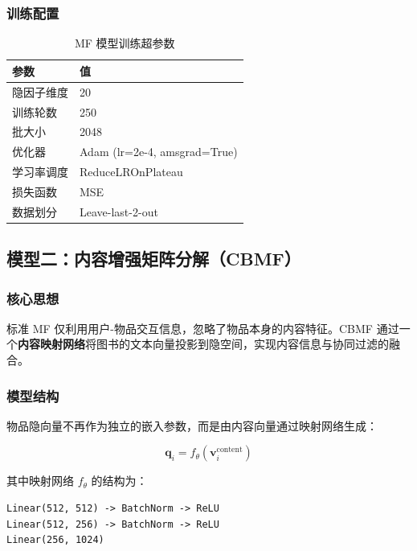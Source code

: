 \documentclass[12pt,a4paper]{article}
\begin{document}
\subsubsection{训练配置}

\begin{table}[H]
\centering
\caption{MF 模型训练超参数}
\begin{tabular}{ll}
\toprule
\textbf{参数} & \textbf{值} \\
\midrule
隐因子维度 & 20 \\
训练轮数 & 250 \\
批大小 & 2048 \\
优化器 & Adam (lr=2e-4, amsgrad=True) \\
学习率调度 & ReduceLROnPlateau \\
损失函数 & MSE \\
数据划分 & Leave-last-2-out \\
\bottomrule
\end{tabular}
\end{table}

\subsection{模型二：内容增强矩阵分解（CBMF）}

\subsubsection{核心思想}

标准 MF 仅利用用户-物品交互信息，忽略了物品本身的内容特征。CBMF 通过一个\textbf{内容映射网络}将图书的文本向量投影到隐空间，实现内容信息与协同过滤的融合。

\subsubsection{模型结构}

物品隐向量不再作为独立的嵌入参数，而是由内容向量通过映射网络生成：

\begin{equation}
    \mathbf{q}_i = f_{\theta}(\mathbf{v}_i^{\text{content}})
\end{equation}

其中映射网络 $f_{\theta}$ 的结构为：

\begin{lstlisting}[caption={CBMF 内容映射网络}]
Linear(512, 512) -> BatchNorm -> ReLU
Linear(512, 256) -> BatchNorm -> ReLU
Linear(256, 1024)
\end{lstlisting}
\end{document}
